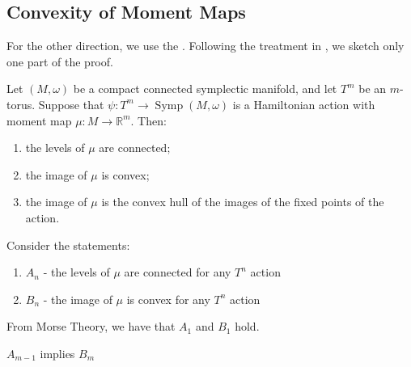 \subsection{Convexity of Moment Maps}
For the other direction, we use the \textcite{AtiyahGS1982}. Following the treatment in \textcite{Silva2001}, we sketch only one part of the proof. 
\begin{theorem} 
Let \((M, \omega)\) be a compact connected symplectic manifold, and let \(T^{m}\) be an \(m\)-torus. Suppose that \(\psi: T^{m} \to \operatorname{Symp}(M, \omega)\) is a Hamiltonian action with moment map \(\mu: M \to \mathbb{R}^{m}\). Then:
\begin{enumerate}
    \item the levels of \(\mu\) are connected;
    \item the image of \(\mu\) is convex;
    \item the image of \(\mu\) is the convex hull of the images of the fixed points of the action.
\end{enumerate}
\end{theorem}
Consider the statements:
\begin{enumerate}
    \item $A_{n}$ - the levels of $\mu$ are connected for any $T^{n}$ action
    \item $B_{n}$ - the image of $\mu$ is convex for any $T^{n}$ action
\end{enumerate} From Morse Theory, we have that $A_{1}$ and $B_{1}$ hold.

\begin{theorem}
$A_{m-1}$ implies $B_{m}$
\end{theorem}

